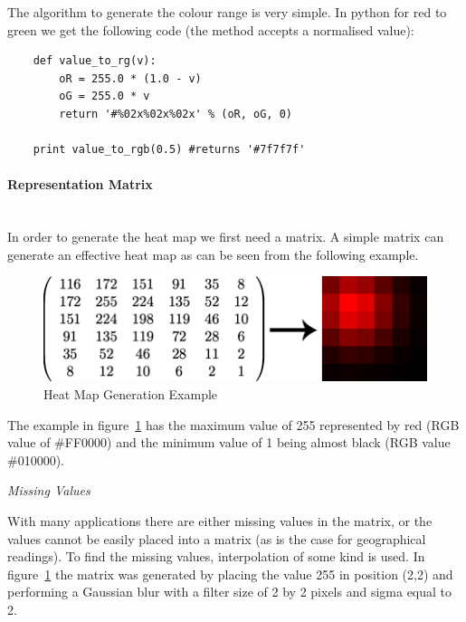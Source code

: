 The algorithm to generate the colour range is very simple. In python for red to green we get the following code (the method accepts a normalised value):


\begin{verbatim}	
	def value_to_rg(v):
	    oR = 255.0 * (1.0 - v)
	    oG = 255.0 * v
	    return '#%02x%02x%02x' % (oR, oG, 0)
	    
	print value_to_rgb(0.5) #returns '#7f7f7f'
\end{verbatim}


\paragraph{Representation Matrix} \hspace{0pt} \\

In order to generate the heat map we first need a matrix. A simple matrix can generate an effective heat map as can be seen from the following example.

\begin{figure}[H]
        \begin{center}
                \includegraphics[scale=0.5]{./images/heatmaps/HeatMapGaussianExample.png}
                \caption{Heat Map Generation Example}
                \label{fig:matrixheatmapexample}
        \end{center}
\end{figure}

The example in figure~\ref{fig:matrixheatmapexample} has the maximum value of 255 represented by red (RGB value of \#FF0000) and the minimum value of 1 being almost black (RGB value \#010000). 

\emph{Missing Values}

With many applications there are either missing values in the matrix, or the values cannot be easily placed into a matrix (as is the case for geographical readings). To find the missing values, interpolation of some kind is used. In figure~\ref{fig:matrixheatmapexample} the matrix was generated by placing the value 255 in position (2,2) and performing a Gaussian blur with a filter size of 2 by 2 pixels and sigma equal to 2. 


